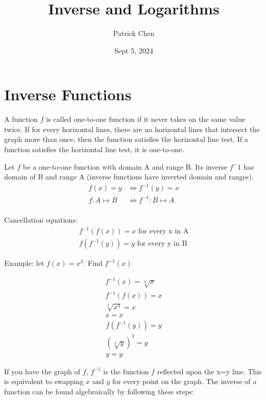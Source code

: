 \documentclass{article}
\title{Inverse and Logarithms}
\author{Patrick Chen}
\date{Sept 5, 2024}
\theoremstyle{mytheoremstyle}
\theoremstyle{mytheoremstyle}
\theoremstyle{myproblemstyle}
\begin{document}
    \maketitle
    \section*{Inverse Functions}
    A function $f$ is called one-to-one function if it never takes on the same
    value twice. If for every horizontal lines, there are no horizontal lines
    that intersect the graph more than once, then the function satisfies the
    horizontal line test. If a function satisfies the horizontal line test, it
    is one-to-one.


    Let $f$ be a one-to-one function with domain A and range B. Its inverse
    $f^-1$ has domain of B and range A (inverse functions have inverted domain
    and ranges).
    \begin{align*}
        f(x) = y &\Leftrightarrow f^{-1}(y) = x \\
        f: A \mapsto B &\Leftrightarrow f^{-1}: B \mapsto A \\
    \end{align*}

    \begin{theorem}
        Cancellation equations:
        \begin{align*}
            f^{-1}(f(x)) = x \text{ for every x in A} \\
            f(f^{-1}(y)) = y \text{ for every y in B}
        \end{align*}
    \end{theorem}

    Example:
    let $f(x)=x^3$. Find $f^{-1}(x)$


    \begin{align*}
        f^{-1}(x)=\sqrt[3]{x} \\
        f^{-1}(f(x))=x \\
        \sqrt[3]{x^3}=x \\
        x=x
    \end{align*}
    \begin{align*}
        f(f^{-1}(y))=y \\
        (\sqrt[3]{y})^3=y \\
        y=y
    \end{align*}

    If you have the graph of $f$, $f^{-1}$ is the function $f$ reflected upon
    the x=y line. This is equivalent to swapping $x$ and $y$ for every point on
    the graph. The inverse of a function can be found algebraically by following
    these steps:
\end{document}

